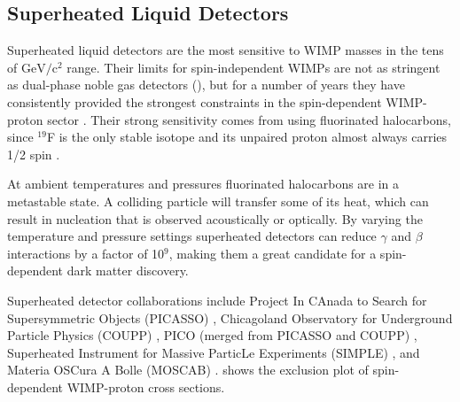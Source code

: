   
 
\subsection{Superheated Liquid Detectors}
\label{subsec:bubbles}
Superheated liquid detectors are the most sensitive to WIMP masses in the tens of $\mathrm{GeV/c^2}$ range.  Their limits for
spin-independent
WIMPs are not as stringent as dual-phase noble gas detectors (), but for a number of years they have
consistently provided the strongest constraints in the spin-dependent WIMP-proton sector .  Their strong
sensitivity comes from using fluorinated
halocarbons, since $^{19}$F is the only stable isotope and its unpaired proton
almost always carries 1/2 spin .

At ambient temperatures and pressures fluorinated halocarbons are in a metastable state.  A colliding particle will transfer some of its
heat, which can result in nucleation that is observed acoustically or optically.  By varying the temperature and pressure settings
superheated detectors can reduce $\gamma$ and $\beta$ interactions by a factor of 10$^{9}$, making them a great candidate for a
spin-dependent dark matter discovery.

Superheated detector collaborations include Project In CAnada to Search for Supersymmetric Objects (PICASSO) ,
Chicagoland Observatory for Underground Particle Physics (COUPP) ,
PICO (merged from PICASSO and COUPP) , Superheated Instrument for Massive ParticLe Experiments (SIMPLE)
, and Materia OSCura A Bolle (MOSCAB) .   shows the exclusion plot of
spin-dependent WIMP-proton cross sections.


